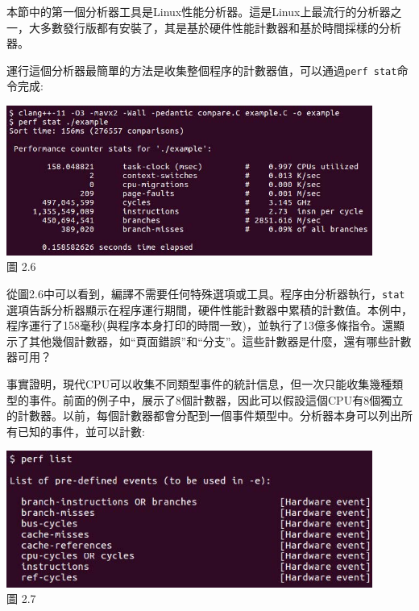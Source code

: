 本節中的第一個分析器工具是Linux性能分析器。這是Linux上最流行的分析器之一，大多數發行版都有安裝了，其是基於硬件性能計數器和基於時間採樣的分析器。

運行這個分析器最簡單的方法是收集整個程序的計數器值，可以通過\texttt{perf stat}命令完成:

\begin{center}
\includegraphics[width=0.9\textwidth]{content/1/chapter2/images/6.jpg}\\
圖 2.6
\end{center}

從圖2.6中可以看到，編譯不需要任何特殊選項或工具。程序由分析器執行，\texttt{stat}選項告訴分析器顯示在程序運行期間，硬件性能計數器中累積的計數值。本例中，程序運行了158毫秒(與程序本身打印的時間一致)，並執行了13億多條指令。還顯示了其他幾個計數器，如“頁面錯誤”和“分支”。這些計數器是什麼，還有哪些計數器可用？

事實證明，現代CPU可以收集不同類型事件的統計信息，但一次只能收集幾種類型的事件。前面的例子中，展示了8個計數器，因此可以假設這個CPU有8個獨立的計數器。以前，每個計數器都會分配到一個事件類型中。分析器本身可以列出所有已知的事件，並可以計數:

\begin{center}
\includegraphics[width=0.9\textwidth]{content/1/chapter2/images/7.jpg}\\
圖 2.7
\end{center}

